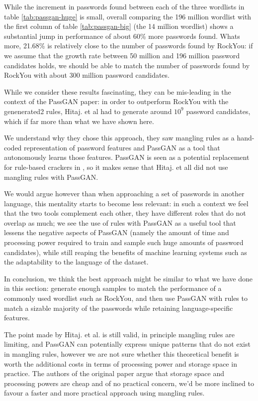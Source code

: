While the increment in passwords found between each of the three wordlists in table \ref{tab:passgan-huge} is small, overall comparing the 196 million wordlist with the first column of table \ref{tab:passgan-big}  (the 14 million wordlist) shows a substantial jump in performance of about 60\% more passwords found.
Whats more, 21.68\% is relatively close to the number of passwords found by RockYou: if we assume that the growth rate between 50 million and 196 million password candidates holds, we should be able to match the number of passwords found by RockYou with about 300 million password candidates.

While we consider these results fascinating, they can be mis-leading in the context of the PassGAN paper: in order to outperform RockYou with the genenerated2 rules, Hitaj. et al had to generate around $10^{9}$ password candidates, which if far more than what we have shown here.

We understand why they chose this approach, they saw mangling rules as a hand-coded representation of password features and PassGAN as a tool that autonomously learns those features.
PassGAN is seen as a potential replacement for rule-based crackers in \cite{PassGAN}, so it makes sense that Hitaj. et all did not use mangling rules with PassGAN.

We would argue however than when approaching a set of passwords in another language, this mentality starts to become less relevant: in such a context we feel that the two tools complement each other, they have different roles that do not overlap as much; we see the use of rules with PassGAN as a useful tool that lessens the negative aspects of PassGAN (namely the amount of time and processing power required to train and sample such huge amounts of password candidates), while still reaping the benefits of machine learning systems such as the adaptability to the language of the dataset.

In conclusion, we think the best approach might be similar to what we have done in this section: generate enough samples to match the performance of a commonly used wordlist such as RockYou, and then use PassGAN with rules to match a sizable majority of the passwords while retaining language-specific features.

The point made by Hitaj. et al. is still valid, in principle mangling rules are limiting, and PassGAN can potentially express unique patterns that do not exist in mangling rules, however we are not sure whether this theoretical benefit is worth the additional costs in terms of processing power and storage space in practice. The authors of the original paper argue that storage space and processing powers are cheap and of no practical concern, we'd be more inclined to favour a faster and more practical approach using mangling rules.


